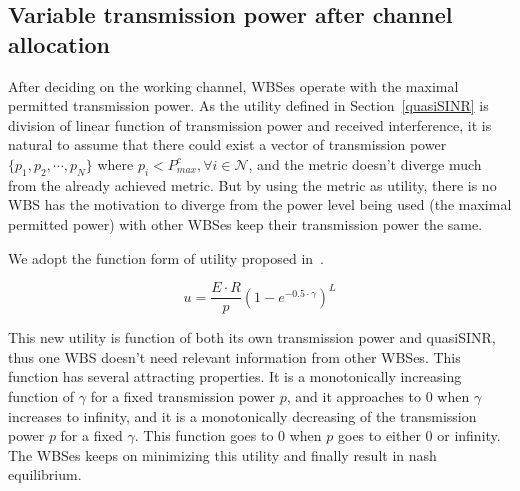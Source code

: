 \subsection{Variable transmission power after channel allocation}
\label{powerAllocation}
After deciding on the working channel, WBSes operate with the maximal permitted transmission power.
As the utility defined in Section~\ref{quasiSINR} is division of linear function of transmission power and received interference, it is natural to assume that there could exist a vector of transmission power $\{p_1, p_2, \cdots, p_N\}$ where $p_i<P_{max}^c,\forall i\in \mathcal{N}$, and the metric doesn't diverge much from the already achieved metric.
But by using the metric as utility, there is no WBS has the motivation to diverge from the power level being used (the maximal permitted power) with other WBSes keep their transmission power the same.

We adopt the function form of utility proposed in~\cite{power_control_utility_98}.

\[u= \dfrac{E\cdot R}{p}(1-e^{-0.5\cdot \gamma})^L\]

This new utility is function of both its own transmission power and quasiSINR, thus one WBS doesn't need relevant information from other WBSes. 
This function has several attracting properties.
It is a monotonically increasing function of $\gamma$ for a fixed transmission power $p$, and it approaches to 0 when $\gamma$ increases to infinity, and it is a monotonically decreasing of the transmission power $p$ for a fixed $\gamma$.
This function goes to 0 when $p$ goes to either 0 or infinity.
The WBSes keeps on minimizing this utility and finally result in nash equilibrium.
 









